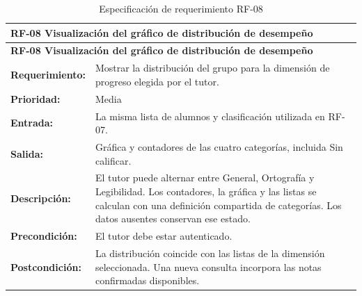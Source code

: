 \begin{longtable}{|p{3.2cm}|p{11.8cm}|}
\caption{Especificación de requerimiento RF-08}\label{rf08} \\ \hline
\multicolumn{2}{|p{15cm}|}{\textbf{RF-08 Visualización del gráfico de distribución de desempeño}} \\ \hline
\endfirsthead
\hline
\multicolumn{2}{|p{15cm}|}{\textbf{RF-08 Visualización del gráfico de distribución de desempeño}} \\ \hline
\endhead
\textbf{Requerimiento:} & Mostrar la distribución del grupo para la dimensión de progreso elegida por el tutor. \\ \hline
\textbf{Prioridad:} & Media \\ \hline
\textbf{Entrada:} & La misma lista de alumnos y clasificación utilizada en RF-07. \\ \hline
\textbf{Salida:} & Gráfica y contadores de las cuatro categorías, incluida Sin calificar. \\ \hline
\textbf{Descripción:} & El tutor puede alternar entre General, Ortografía y Legibilidad. Los contadores, la gráfica y las listas se calculan con una definición compartida de categorías. Los datos ausentes conservan ese estado. \\ \hline
\textbf{Precondición:} & El tutor debe estar autenticado. \\ \hline
\textbf{Postcondición:} & La distribución coincide con las listas de la dimensión seleccionada. Una nueva consulta incorpora las notas confirmadas disponibles. \\ \hline
\end{longtable}



